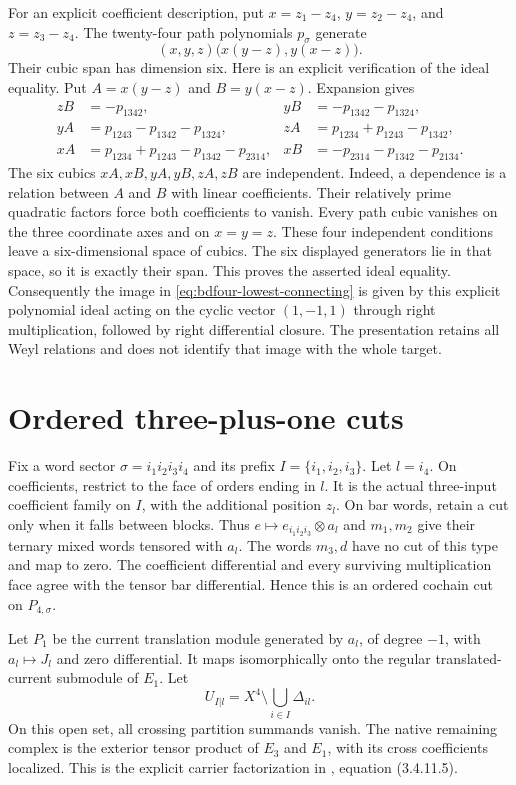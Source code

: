 For an explicit coefficient description, put $x=z_1-z_4$, $y=z_2-z_4$, and $z=z_3-z_4$.
The twenty-four path polynomials $p_\sigma$ generate
\[
 (x,y,z)\bigl(x(y-z),y(x-z)\bigr).
\]
Their cubic span has dimension six.
Here is an explicit verification of the ideal equality.
Put $A=x(y-z)$ and $B=y(x-z)$.
Expansion gives
\[
 \begin{aligned}
 zB&=-p_{1342},& yB&=-p_{1342}-p_{1324},\\
 yA&=p_{1243}-p_{1342}-p_{1324},&
 zA&=p_{1234}+p_{1243}-p_{1342},\\
 xA&=p_{1234}+p_{1243}-p_{1342}-p_{2314},&
 xB&=-p_{2314}-p_{1342}-p_{2134}.
 \end{aligned}
\]
The six cubics $xA,xB,yA,yB,zA,zB$ are independent.
Indeed, a dependence is a relation between $A$ and $B$ with linear coefficients.
Their relatively prime quadratic factors force both coefficients to vanish.
Every path cubic vanishes on the three coordinate axes and on $x=y=z$.
These four independent conditions leave a six-dimensional space of cubics.
The six displayed generators lie in that space, so it is exactly their span.
This proves the asserted ideal equality.
Consequently the image in \eqref{eq:bdfour-lowest-connecting} is given by this explicit polynomial ideal acting on the cyclic vector $(1,-1,1)$ through right multiplication, followed by right differential closure.
The presentation retains all Weyl relations and does not identify that image with the whole target.

\section{Ordered three-plus-one cuts}

Fix a word sector $\sigma=i_1i_2i_3i_4$ and its prefix $I=\{i_1,i_2,i_3\}$.
Let $l=i_4$.
On coefficients, restrict to the face of orders ending in $l$.
It is the actual three-input coefficient family on $I$, with the additional position $z_l$.
On bar words, retain a cut only when it falls between blocks.
Thus $e\mapsto e_{i_1i_2i_3}\otimes a_l$ and
$m_1,m_2$ give their ternary mixed words tensored with $a_l$.
The words $m_3,d$ have no cut of this type and map to zero.
The coefficient differential and every surviving multiplication face agree with the tensor bar differential.
Hence this is an ordered cochain cut on $P_{4,\sigma}$.

Let $P_1$ be the current translation module generated by $a_l$, of degree $-1$, with $a_l\mapsto J_l$ and zero differential.
It maps isomorphically onto the regular translated-current submodule of $E_1$.
Let
\[
 U_{I|l}=X^4\setminus\bigcup_{i\in I}\Delta_{il}.
\]
On this open set, all crossing partition summands vanish.
The native remaining complex is the exterior tensor product of $E_3$ and $E_1$, with its cross coefficients localized.
This is the explicit carrier factorization in \cite{BDtranslated}, equation (3.4.11.5).

